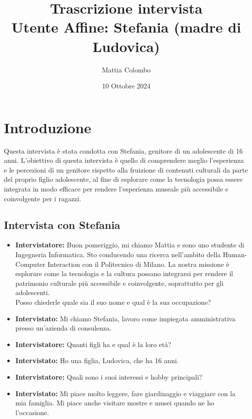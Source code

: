 \documentclass{article}
\title{\textbf{Trascrizione intervista}\\ Utente Affine: Stefania (madre di Ludovica)}
\author{Mattia Colombo}
\date{10 Ottobre 2024}
\begin{document}
\maketitle

\section{Introduzione}
Questa intervista è stata condotta con Stefania, genitore di un adolescente di 16 anni.
L'obiettivo di questa intervista è quello di comprendere meglio l'esperienza e le percezioni di un genitore rispetto alla fruizione di contenuti culturali da parte del proprio figlio adolescente, al fine di esplorare come la tecnologia possa essere integrata in modo efficace per rendere l’esperienza museale più accessibile e coinvolgente per i ragazzi.

\subsection{\textcolor{subsectioncolor}{Intervista con Stefania}}



\begin{itemize}
\item \textbf{Intervistatore:} Buon pomeriggio, mi chiamo Mattia e sono uno studente di Ingegneria Informatica. Sto conducendo una ricerca nell’ambito della Human-Computer Interaction con il Politecnico di Milano. La nostra missione è esplorare come la tecnologia e la cultura possano integrarsi per rendere il patrimonio culturale più accessibile e coinvolgente, soprattutto per gli adolescenti.\\
    Posso chiederle quale sia il suo nome e qual è la sua occupazione?
    \item \textbf{Intervistato:} Mi chiamo Stefania, lavoro come impiegata amministrativa presso un’azienda di consulenza.
    
    \item \textbf{Intervistatore:} Quanti figli ha e qual è la loro età?
    \item \textbf{Intervistato:} Ho una figlia, Ludovica, che ha 16 anni.
    
    \item \textbf{Intervistatore:} Quali sono i suoi interessi e hobby principali?
    \item \textbf{Intervistato:} Mi piace molto leggere, fare giardinaggio e viaggiare con la mia famiglia. Mi piace anche visitare mostre e musei quando ne ho l’occasione.
\end{itemize}
\end{document}
